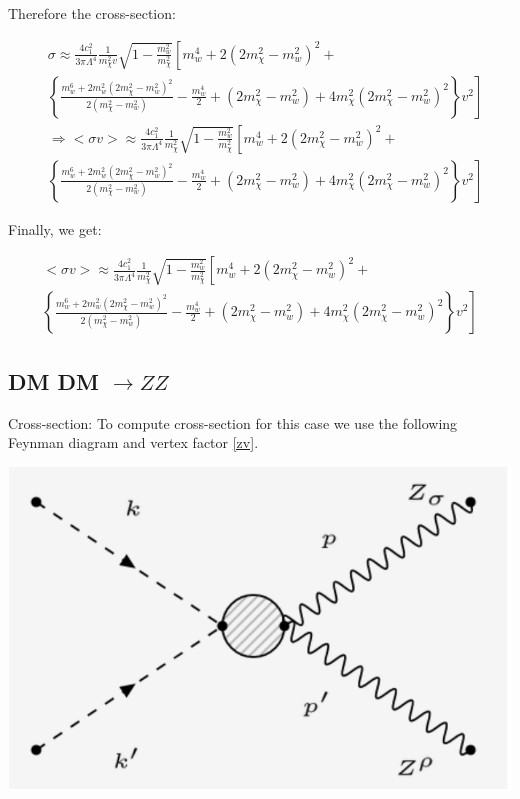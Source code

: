 \documentclass[12pt]{report}
\begin{document}
Therefore the cross-section:

\begin{align*}
&\sigma  \approx \frac{4c^2_1}{3\pi \Lambda^4}  \frac{1}{m^2_\chi v}  \sqrt{1-\frac{m^2_w}{m^2_\chi}} \left[ m^4_w + 2(2 m^2_\chi -m^2_w)^2 + \right. \\
& \left. \left\{ \frac{ m^6_w+2 m^2_w (2 m^2_\chi - m^2_w)^2 }{2(m^2_\chi - m^2_w)} -\frac{m^4_w}{2} + (2 m^2_\chi - m^2_w) + 4 m^2_\chi (2 m^2_\chi - m^2_w)^2 \right\} v^2  \right]\\
&\Rightarrow <\sigma v> \approx \frac{4c^2_1}{3 \pi \Lambda^4}  \frac{1}{m^2_\chi}  \sqrt{1-\frac{m^2_w}{m^2_\chi}} \left[ m^4_w + 2(2 m^2_\chi -m^2_w)^2 + \right. \\
& \left. \left\{ \frac{ m^6_w+2 m^2_w (2 m^2_\chi - m^2_w)^2 }{2(m^2_\chi - m^2_w)} -\frac{m^4_w}{2} + (2 m^2_\chi - m^2_w) + 4 m^2_\chi (2 m^2_\chi - m^2_w)^2 \right\} v^2  \right]  
\end{align*}

Finally, we get:

\begin{multline}
<\sigma v> \approx \frac{4c^2_1}{3 \pi \Lambda^4}  \frac{1}{m^2_\chi}  \sqrt{1-\frac{m^2_w}{m^2_\chi}} \left[ m^4_w + 2(2 m^2_\chi -m^2_w)^2 + \right. \\
\left. \left\{ \frac{ m^6_w+2 m^2_w (2 m^2_\chi - m^2_w)^2 }{2(m^2_\chi - m^2_w)} -\frac{m^4_w}{2} + (2 m^2_\chi - m^2_w) + 4 m^2_\chi (2 m^2_\chi - m^2_w)^2 \right\} v^2  \right]  \label{wwcross} 
\end{multline}

\newpage

\subsection{DM DM $\longrightarrow ZZ$}


Cross-section: To compute cross-section for this case we use the following Feynman diagram and vertex factor \ref{zv}.

\begin{center}
\includegraphics[scale=0.3]{ZZ.png}
\end{center}
\end{document}
